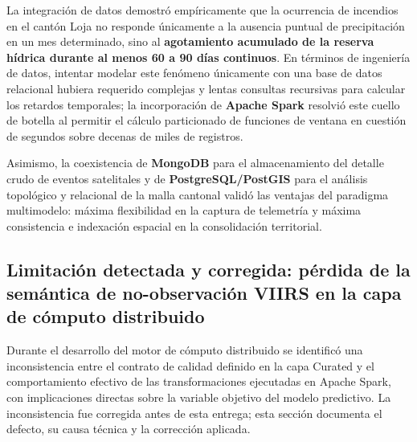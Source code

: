 \documentclass[11pt,a4paper]{article}
\begin{document}
La integraci\'on de datos demostr\'o emp\'iricamente que la ocurrencia de incendios en el cant\'on Loja no responde \'unicamente a la ausencia puntual de precipitaci\'on en un mes determinado, sino al \textbf{agotamiento acumulado de la reserva h\'idrica durante al menos 60 a 90 d\'ias continuos}. En t\'erminos de ingenier\'ia de datos, intentar modelar este fen\'omeno \'unicamente con una base de datos relacional hubiera requerido complejas y lentas consultas recursivas para calcular los retardos temporales; la incorporaci\'on de \textbf{Apache Spark} resolvi\'o este cuello de botella al permitir el c\'alculo particionado de funciones de ventana en cuesti\'on de segundos sobre decenas de miles de registros.

Asimismo, la coexistencia de \textbf{MongoDB} para el almacenamiento del detalle crudo de eventos satelitales y de \textbf{PostgreSQL/PostGIS} para el an\'alisis topol\'ogico y relacional de la malla cantonal valid\'o las ventajas del paradigma multimodelo: m\'axima flexibilidad en la captura de telemetr\'ia y m\'axima consistencia e indexaci\'on espacial en la consolidaci\'on territorial.

\subsection{Limitaci\'on detectada y corregida: p\'erdida de la sem\'antica de no-observaci\'on VIIRS en la capa de c\'omputo distribuido}
\label{sec:limitacion_apto_analisis}
Durante el desarrollo del motor de c\'omputo distribuido se identific\'o una inconsistencia entre el contrato de calidad definido en la capa Curated y el comportamiento efectivo de las transformaciones ejecutadas en Apache Spark, con implicaciones directas sobre la variable objetivo del modelo predictivo. La inconsistencia fue corregida antes de esta entrega; esta secci\'on documenta el defecto, su causa t\'ecnica y la correcci\'on aplicada.
\end{document}

